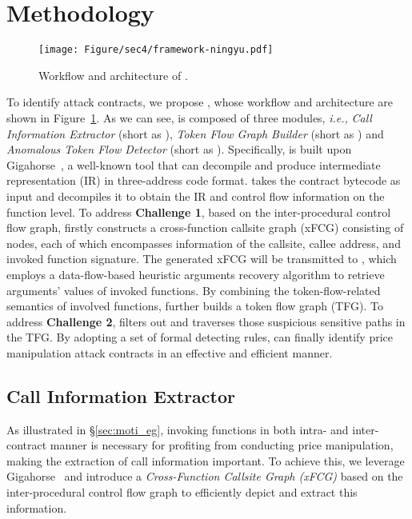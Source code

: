 \section{Methodology}
\label{sec:methodology}



\begin{figure}[t]
    \captionsetup{justification=centering}
    \centering
    \texttt{[image: Figure/sec4/framework-ningyu.pdf]}
    \vspace{-0.2in}
    \caption{Workflow and architecture of {\tool}.}
    \vspace{-0.1in}
    \label{fig:workflow}
\end{figure}

To identify attack contracts, we propose {\tool}, whose workflow and architecture are shown in Figure~\ref{fig:workflow}. As we can see, {\tool} is composed of three modules, \textit{i.e.,} \textit{Call Information Extractor} (short as {\sx}), \textit{Token Flow Graph Builder} (short as {\sy}) and \textit{Anomalous Token Flow Detector} (short as {\sz}).
Specifically, {\sx} is built upon Gigahorse~\cite{grech2019gigahorse, grech2022elipmoc}, a well-known tool that can decompile and produce intermediate representation (IR) in three-address code format. {\sx} takes the contract bytecode as input and decompiles it to obtain the IR and control flow information on the function level.
To address \textbf{Challenge 1}, based on the inter-procedural control flow graph, {\sx} firstly constructs a cross-function callsite graph (xFCG) consisting of nodes, each of which encompasses information of the callsite, callee address, and invoked function signature. The generated xFCG will be transmitted to {\sy}, which employs a data-flow-based heuristic arguments recovery algorithm to retrieve arguments' values of invoked functions. By combining the token-flow-related semantics of involved functions, {\sy} further builds a token flow graph (TFG).
To address \textbf{Challenge 2}, {\sz} filters out and traverses those suspicious sensitive paths in the TFG. By adopting a set of formal detecting rules, {\sz} can finally identify price manipulation attack contracts in an effective and efficient manner.



\subsection{Call Information Extractor}
\label{sec:extract}
As illustrated in \S\ref{sec:moti_eg}, invoking functions in both intra- and inter-contract manner is necessary for profiting from conducting price manipulation, making the extraction of call information important.
To achieve this, we leverage Gigahorse~\cite{grech2019gigahorse} and introduce a \textit{Cross-Function Callsite Graph (xFCG)} based on the inter-procedural control flow graph to efficiently depict and extract this information.


